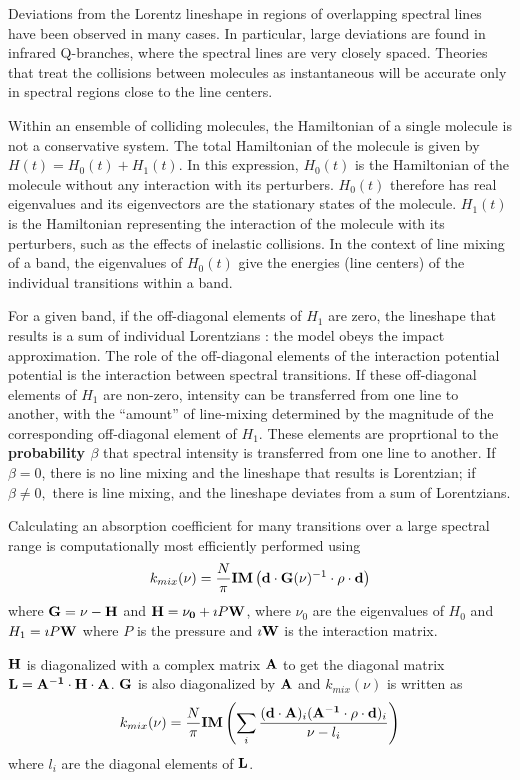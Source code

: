 \documentclass[11pt]{article}
\begin{document}
Deviations from the Lorentz lineshape in regions of overlapping spectral
lines have been observed in many cases. In particular, large deviations are
found in infrared Q-branches, where the spectral lines are very closely 
spaced.  Theories that treat the collisions between molecules as 
instantaneous will be accurate only in spectral regions close to the 
line centers.  

Within an ensemble of colliding molecules, the Hamiltonian of a single 
molecule is not a conservative system.  The total Hamiltonian 
of the molecule is given by $H(t)=H_{0}(t)+ H_{1}(t)$.  In this
expression, $H_{0}(t)$ is the Hamiltonian of the molecule without any
interaction with its perturbers.  $H_{0}(t)$ therefore has real eigenvalues
and its eigenvectors are the stationary states of the molecule.  
$H_{1}(t)$ is the Hamiltonian representing the interaction of the molecule
with its perturbers, such as the effects of inelastic collisions.  
In the context of line mixing of a band, the eigenvalues of $H_{0}(t)$ give
the energies (line centers) of the individual transitions within a band.

For a given band, if the off-diagonal elements of $H_{1}$ are zero, the 
lineshape that results is a sum of individual Lorentzians : the model obeys 
the impact approximation.  The role of the off-diagonal elements of the 
interaction potential potential is the interaction between spectral 
transitions. If these off-diagonal elements of  $H_{1}$ are non-zero, 
intensity can be transferred from one line to another, 
with the ``amount'' of line-mixing determined by the magnitude of the 
corresponding off-diagonal element of $H_{1}$.  These elements are
proprtional to the {\bf probability $\beta$} that spectral intensity is 
transferred from one line to another. If $\beta = 0$, there is no line 
mixing and the lineshape that results is Lorentzian; if $\beta \ne 0,$ 
there is line mixing, and the lineshape deviates from a sum of Lorentzians.

Calculating an absorption coefficient for many transitions over a
large spectral range is computationally most efficiently performed using 
\[
k_{mix}(\nu)=\frac{N}{\pi} {\bf IM} \left({\bf d}\cdot{\bf G}({
\bf
  \nu})^{-1} \cdot{\bf \rho}\cdot{\bf d}\right)
\]
where ${\bf G}={\bf \nu}-{\bf H}$ and 
${\bf H}={\bf \nu_{0}}+\imath P{\bf W}$, where $\nu_{0}$ are the 
eigenvalues of $H_{0}$ and $H_{1} = \imath P{\bf W}$ where $P$ is the 
pressure and $\imath {\bf W}$ is the interaction matrix. 
 
${\bf H}$ is diagonalized with a complex matrix ${\bf A}$ to get the 
diagonal matrix ${\bf L}={\bf A^{-1}}\cdot{\bf H}\cdot{\bf A}$.
${\bf G}$ is also diagonalized by ${\bf A}$ and $k_{mix}(\nu)$ is written
as
\[
k_{mix}(\nu)=\frac{N}{\pi} {\bf IM} \left(\sum_{i}\frac{({\bf d
\cdot
    A})_{i} ({\bf A^{-1}\cdot\rho\cdot d})_{i}}{\nu - l_{i}}\right)
\]
where $l_{i}$ are the diagonal elements of ${\bf L}$.  
\end{document}
